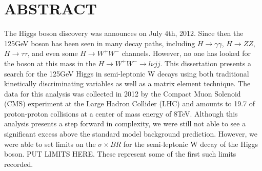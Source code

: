 %
%
%

\chapter*{ABSTRACT}

\pagestyle{plain} %
\setcounter{page}{2}

\indent The Higgs boson discovery was announces on July 4th, 2012. Since then the 125\unit{\GeV} boson has been seen in many decay paths, including $H{\rightarrow}\gamma\gamma$, $H{\rightarrow}ZZ$, $H{\rightarrow}\tau\tau$, and even some $H{\rightarrow}W^{+}W^{-}$ channels.
However, no one has looked for the boson at this mass in the $H{\rightarrow}W^{+}W^{-}{\rightarrow}l{\nu}jj$.
This dissertation presents a search for the 125\unit{\GeV} Higgs in semi-leptonic W decays using both traditional kinetically discriminating variables as well as a matrix element technique.
The data for this analysis was collected in 2012 by the Compact Muon Solenoid (CMS) experiment at the Large Hadron Collider (LHC) and amounts to 19.7\unit{\fbinv} of proton-proton collisions at a center of mass energy of 8\unit{\TeV}.
Although this analysis presents a step forward in complexity, we were still not able to see a significant excess above the standard model background prediction.
However, we were able to set limits on the $\sigma\times{BR}$ for the semi-leptonic W decay of the Higgs boson.
PUT LIMITS HERE.
These represent some of the first such limits recorded.


 

\pagebreak{}



